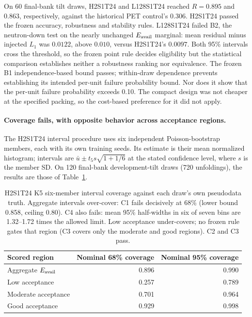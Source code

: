On 60 final-bank tilt draws, H2S1T24 and L128S1T24 reached $R=0.895$ and $0.863$, respectively, against the historical PET control's $0.306$. H2S1T24 passed the frozen accuracy, robustness and stability rules. L128S1T24 failed B2, the neutron-down test on the nearly unchanged $E_{\mathrm{avail}}$ marginal: mean residual minus injected $L_1$ was $0.0122$, above $0.010$, versus H2S1T24's $0.0097$. Both 95\% intervals cross the threshold, so the frozen point rule decides eligibility but the statistical comparison establishes neither a robustness ranking nor equivalence. The frozen B1 independence-based bound passes; within-draw dependence prevents establishing its intended per-unit failure probability bound. Nor does it show that the per-unit failure probability exceeds 0.10. The compact design was not cheaper at the specified packing, so the cost-based preference for it did not apply.

\paragraph{Coverage fails, with opposite behavior across acceptance regions.} The H2S1T24 interval procedure uses six independent Poisson-bootstrap members, each with its own training seeds. Its estimate is their mean normalized histogram; intervals are $\bar u\pm t_5 s\sqrt{1+1/6}$ at the stated confidence level, where $s$ is the member SD. On 120 final-bank development-tilt draws (720 unfoldings), the results are those of Table~\ref{tab:pet-final-coverage}.

\begin{table}[htbp]
\centering
\small
\begin{tabular}{@{}lrr@{}}
\toprule
Scored region & Nominal 68\% coverage & Nominal 95\% coverage \\
\midrule
Aggregate $E_{\mathrm{avail}}$ & 0.896 & 0.990 \\
Low acceptance & 0.257 & 0.789 \\
Moderate acceptance & 0.701 & 0.964 \\
Good acceptance & 0.929 & 0.998 \\
\bottomrule
\end{tabular}
\caption{H2S1T24 K5 six-member interval coverage against each draw's own pseudodata truth. Aggregate intervals over-cover: C1 fails decisively at 68\% (lower bound 0.858, ceiling 0.80). C4 also fails: mean 95\% half-widths in six of seven bins are 1.32--1.72 times the allowed limit. Low acceptance under-covers; no frozen rule gates that region (C3 covers only the moderate and good regions). C2 and C3 pass.}
\label{tab:pet-final-coverage}
\end{table}

